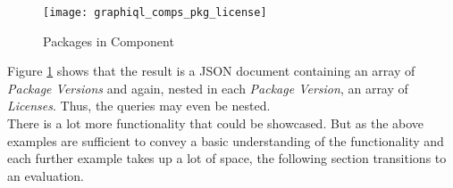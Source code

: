 \begin{figure}[H]
	\centering
	\texttt{[image: graphiql\_comps\_pkg\_license]}
	\caption[GraphQL Query Packages in Component]{Packages in Component }
	\label{fig:CompWithPkgs}
\end{figure}

Figure \ref{fig:CompWithPkgs} shows that the result is a JSON document containing an array of \emph{Package Versions} and again, nested in each \emph{Package Version}, an array of \emph{Licenses}. Thus, the queries may even be nested.\\

There is a lot more functionality that could be showcased. But as the above examples are sufficient to convey a basic understanding of the functionality and each further example takes up a lot of space, the following section transitions to an evaluation. 

